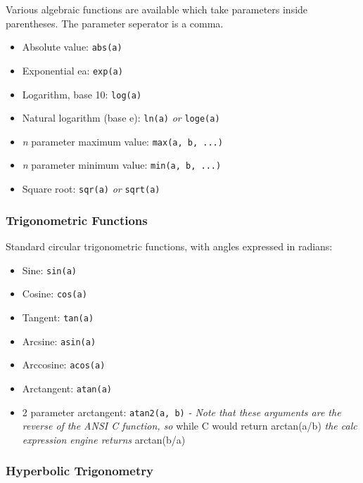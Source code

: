 Various algebraic functions are available which take parameters inside parentheses. The parameter seperator is a comma.\emph{}

\begin{itemize}\item Absolute value: \verb|abs(a)|

\item Exponential ea: \verb|exp(a)|

\item Logarithm, base 10: \verb|log(a)|

\item Natural logarithm (base e): \verb|ln(a)| \emph{or} \verb|loge(a)|

\item \emph{n} parameter maximum value: \verb|max(a, b, ...)|

\item \emph{n} parameter minimum value: \verb|min(a, b, ...)|

\item Square root: \verb|sqr(a)| \emph{or} \verb|sqrt(a)|

\end{itemize}\subsubsection{Trigonometric Functions}

Standard circular trigonometric functions, with angles expressed in radians:

\begin{itemize}\item Sine: \verb|sin(a)|

\item Cosine: \verb|cos(a)|

\item Tangent: \verb|tan(a)|

\item Arcsine: \verb|asin(a)|

\item Arccosine: \verb|acos(a)|

\item Arctangent: \verb|atan(a)|

\item 2 parameter arctangent: \verb|atan2(a, b)|\emph{ - Note that these arguments are the reverse of the ANSI C function, so }
while C would return arctan(a/b)\emph{ the calc expression engine returns }arctan(b/a)

\end{itemize}\subsubsection{Hyperbolic Trigonometry}

